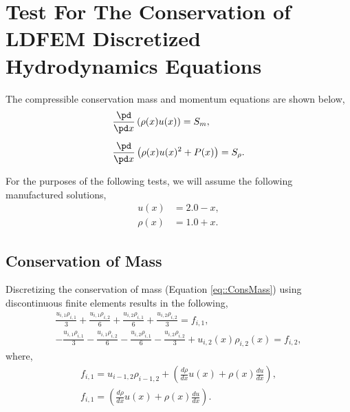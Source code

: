 \documentclass{article}
\begin{document}
\section{Test For The Conservation of LDFEM Discretized Hydrodynamics Equations}
The compressible conservation mass and momentum equations are shown below,
\begin{align}
\label{eq::ConsMass}
&\frac{\pd}{\pd x}\left( \rho(x) u(x) \right) = S_m,\\[5pt]
\label{eq::ConsMomen}
&\frac{\pd}{\pd x}\left( \rho(x) u(x)^2 + P(x) \right) = S_\rho.
\end{align}

For the purposes of the following tests, we will assume the following manufactured solutions,
\begin{align}
\label{eq::MMS-Velocity}
u(x) &= 2.0 - x,\\[5pt]
\label{eq::MMS-Density}
\rho(x) &= 1.0 + x.
\end{align}

\subsection{Conservation of Mass}
Discretizing the conservation of mass (Equation \ref{eq::ConsMass}) using discontinuous finite elements results in the following,
\begin{align}
\label{eq::LDFEM-MassLHS-1}
\frac{u_{i,1}\rho_{i,1}}{3} + \frac{u_{i,1}\rho_{i,2}}{6} + \frac{u_{i,2}\rho_{i,1}}{6} + \frac{u_{i,2}\rho_{i,2}}{3} = f_{i,1},\\[5pt]
\label{eq::LDFEM-MassLHS-2}
-\frac{u_{i,1}\rho_{i,1}}{3} - \frac{u_{i,1}\rho_{i,2}}{6} - \frac{u_{i,2}\rho_{i,1}}{6} - \frac{u_{i,2}\rho_{i,2}}{3} + u_{i,2}(x)\rho_{i,2}(x) = f_{i,2},
\end{align}
where,
\begin{align}
\label{eq::LDFEM-MassRHS-1}
f_{i,1} = u_{i-1,2}\rho_{i-1,2} + \left( \frac{d\rho}{dx}u(x) + \rho(x)\frac{du}{dx} \right),\\[5pt]
\label{eq::LDFEM-MassRHS-2}
f_{i,1} = \left( \frac{d\rho}{dx}u(x) + \rho(x)\frac{du}{dx} \right).
\end{align}
\end{document}
